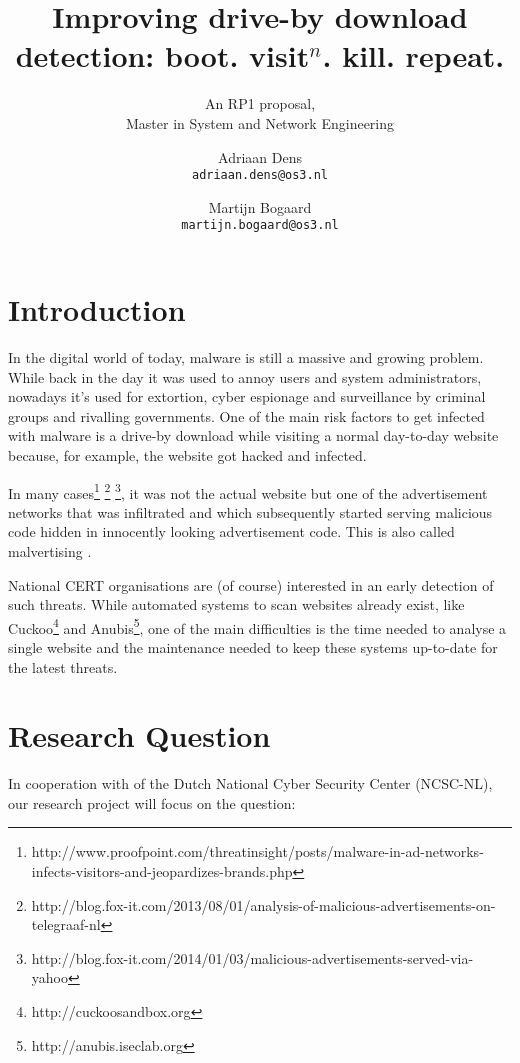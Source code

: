 \documentclass{scrartcl}
\title{Improving drive-by download detection: boot. visit$^n$. kill. repeat.}
\subtitle{An RP1 proposal,\\Master in System and Network Engineering}
\author{
  Adriaan Dens\\
   \texttt{adriaan.dens@os3.nl}
  \and
  Martijn Bogaard\\
   \texttt{martijn.bogaard@os3.nl}
}
\begin{document}
\maketitle

\section{Introduction}

In the digital world of today, malware is still a massive and growing problem. While back in the day it was used to annoy users and system administrators, nowadays it's used for extortion, cyber espionage and surveillance by criminal groups and rivalling governments. One of the main risk factors to get infected with malware is a drive-by download while visiting a normal day-to-day website because, for example, the website got hacked and infected. 

In many cases\footnote{http://www.proofpoint.com/threatinsight/posts/malware-in-ad-networks-infects-visitors-and-jeopardizes-brands.php} \footnote{http://blog.fox-it.com/2013/08/01/analysis-of-malicious-advertisements-on-telegraaf-nl} \footnote{http://blog.fox-it.com/2014/01/03/malicious-advertisements-served-via-yahoo}, it was not the actual website but one of the advertisement networks that was infiltrated and which subsequently started serving malicious code hidden in innocently looking advertisement code. This is also called malvertising \cite{Li2012}.


National CERT organisations are (of course) interested in an early detection of such threats. While automated systems to scan websites already exist, like Cuckoo\footnote{http://cuckoosandbox.org} and Anubis\footnote{http://anubis.iseclab.org}, one of the main difficulties is the time needed to analyse a single website and the maintenance needed to keep these systems up-to-date for the latest threats.

\section{Research Question}
In cooperation with of the Dutch National Cyber Security Center (NCSC-NL), our research project will focus on the question:\\ %
\end{document}

